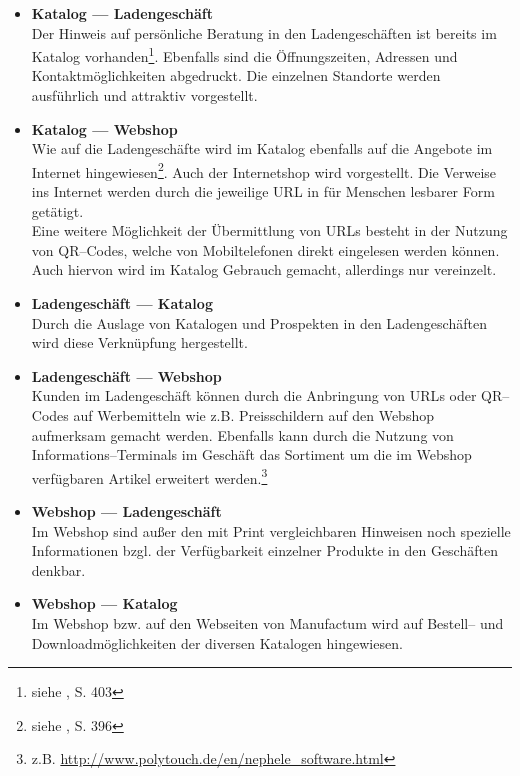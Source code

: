 \begin{itemize}
\item{\textbf{Katalog --- Ladengeschäft}\\
Der Hinweis auf persönliche Beratung in den Ladengeschäften ist bereits im Katalog vorhanden\footnote{siehe \cite{manufactum}, S. 403}. Ebenfalls sind die Öffnungszeiten, Adressen und Kontaktmöglichkeiten abgedruckt. Die einzelnen Standorte werden ausführlich und attraktiv vorgestellt.
}
\item{\textbf{Katalog --- Webshop}\\
Wie auf die Ladengeschäfte wird im Katalog ebenfalls auf die Angebote im Internet hingewiesen\footnote{siehe \cite{manufactum}, S. 396}. Auch der Internetshop wird vorgestellt. Die Verweise ins Internet werden durch die jeweilige \ac{URL} in für Menschen lesbarer Form getätigt.\\
Eine weitere Möglichkeit der Übermittlung von URLs besteht in der Nutzung von QR--Codes, welche von Mobiltelefonen direkt eingelesen werden können. Auch hiervon wird im Katalog Gebrauch gemacht, allerdings nur vereinzelt.
}
\item{\textbf{Ladengeschäft --- Katalog}\\
Durch die Auslage von Katalogen und Prospekten in den Ladengeschäften wird diese Verknüpfung hergestellt.
}
\item{\textbf{Ladengeschäft --- Webshop}\\
Kunden im Ladengeschäft können durch die Anbringung von \ac{URL}s oder QR--Codes auf Werbemitteln wie z.B. Preisschildern auf den Webshop aufmerksam gemacht werden. Ebenfalls kann durch die Nutzung von Infor\-mations–Ter\-minals im Geschäft das Sortiment um die im Webshop verfügbaren Artikel erweitert werden.\footnote{z.B. \url{http://www.polytouch.de/en/nephele_software.html}}
}
\item{\textbf{Webshop --- Ladengeschäft}\\
Im Webshop sind außer den mit Print vergleichbaren Hinweisen noch spezielle Informationen bzgl. der Verfügbarkeit einzelner Produkte in den Geschäften denkbar. 
}
\item{\textbf{Webshop --- Katalog}\\
Im Webshop bzw. auf den Webseiten von Manufactum wird auf Bestell-- und Downloadmöglichkeiten der diversen Katalogen hingewiesen.
}
\end{itemize}